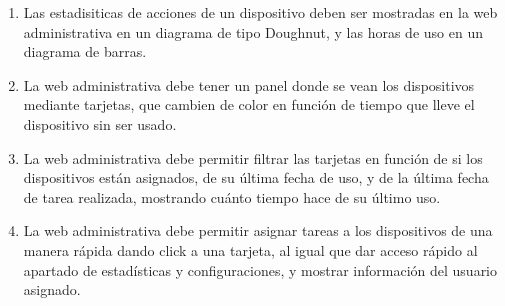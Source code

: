 \begin{enumerate}[label=NF\arabic* -]
    \item Las estadisiticas de acciones de un dispositivo deben ser mostradas en la web administrativa en un diagrama de tipo Doughnut, y las horas de uso en un diagrama de barras.
    
    \item La web administrativa debe tener un panel donde se vean los dispositivos mediante tarjetas, que cambien de color en función de tiempo que lleve el dispositivo sin ser usado.
    
    \item La web administrativa debe permitir filtrar las tarjetas en función de si los dispositivos están asignados, de su última fecha de uso, y de la última fecha de tarea realizada, mostrando cuánto tiempo hace de su último uso.
    
    \item La web administrativa debe permitir asignar tareas a los dispositivos de una manera rápida dando click a una tarjeta, al igual que dar acceso rápido al apartado de estadísticas y configuraciones, y mostrar información del usuario asignado.
    
\end{enumerate}